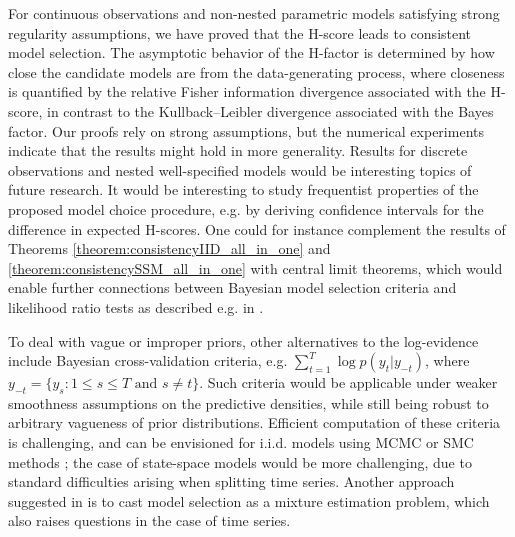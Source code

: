 \documentclass[12pt]{article}
\theoremstyle{plain}
\theoremstyle{definition}
\begin{document}
	For continuous observations and non-nested parametric models satisfying strong
	regularity assumptions, we have proved that the H-score leads to consistent
	model selection. The asymptotic behavior of the H-factor is determined by how
	close the candidate models are from the data-generating process, where 
	closeness is quantified by the relative Fisher information divergence associated with the H-score, in
	contrast to the Kullback–Leibler divergence associated with the Bayes factor. Our proofs rely on strong assumptions, but the numerical experiments indicate 
	that the results might hold in more generality. Results for discrete observations and nested
	well-specified models would be interesting topics of future research. 
	It would be interesting to study frequentist properties of the proposed model choice procedure, 
	e.g.\! by deriving confidence intervals for the difference in expected H-scores. 
	One could for instance complement the results of Theorems
	\ref{theorem:consistencyIID_all_in_one} and
	\ref{theorem:consistencySSM_all_in_one} with central limit
	theorems, which would enable further connections between Bayesian model selection criteria
	and likelihood ratio tests as described e.g.\! in \citet{vuong1989likelihood}.
	
	To deal with vague or improper priors, other alternatives to the log-evidence include Bayesian
	cross-validation criteria, e.g. $\sum_{t=1}^T \log p(y_t|y_{-t})$, where $y_{-t} = \{y_s:1\leq s\leq T
	\text{ and } s\neq t\}$. Such criteria would be
	applicable under weaker smoothness assumptions on the predictive densities,
	while still being robust to arbitrary vagueness of
	prior distributions. Efficient computation of these criteria
	is challenging,
	and can be envisioned for i.i.d.\! models using MCMC \citep{alqallaf2001cross} or SMC methods
	\citep{bornn2010efficient}; the case of state-space models would
	be more challenging, due to standard difficulties arising when splitting time series. Another approach suggested in
	\citet{kamary:mengersen:robert:rousseau2014} is to cast model selection as a
	mixture estimation problem, which also raises questions in the case of time series.
	
	
	
\end{document}
